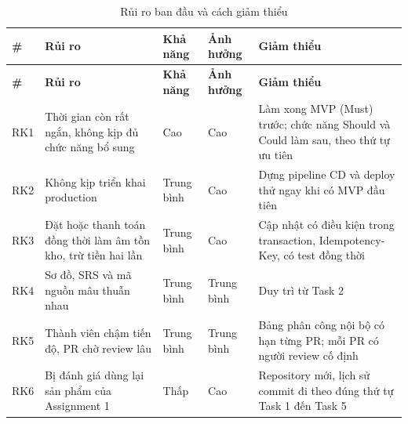 {\small
\begin{longtable}{@{}L{1cm}L{4.2cm}L{1.7cm}L{1.7cm}L{5.3cm}@{}}
\caption{Rủi ro ban đầu và cách giảm thiểu}\label{tab:ruiro}\\
\toprule
\textbf{\#} & \textbf{Rủi ro} & \textbf{Khả năng} & \textbf{Ảnh hưởng} & \textbf{Giảm thiểu} \\ \midrule \endfirsthead
\toprule \textbf{\#} & \textbf{Rủi ro} & \textbf{Khả năng} & \textbf{Ảnh hưởng} & \textbf{Giảm thiểu} \\ \midrule \endhead
\bottomrule \endfoot
RK1 & Thời gian còn rất ngắn, không kịp đủ chức năng bổ sung & Cao & Cao & Làm xong MVP (Must) trước; chức năng Should và Could làm sau, theo thứ tự ưu tiên \\
RK2 & Không kịp triển khai production & Trung bình & Cao & Dựng pipeline CD và deploy thử ngay khi có MVP đầu tiên \\
RK3 & Đặt hoặc thanh toán đồng thời làm âm tồn kho, trừ tiền hai lần & Trung bình & Cao & Cập nhật có điều kiện trong transaction, Idempotency-Key, có test đồng thời \\
RK4 & Sơ đồ, SRS và mã nguồn mâu thuẫn nhau & Trung bình & Trung bình & Duy trì  từ Task 2 \\
RK5 & Thành viên chậm tiến độ, PR chờ review lâu & Trung bình & Trung bình & Bảng phân công nội bộ có hạn từng PR; mỗi PR có người review cố định \\
RK6 & Bị đánh giá dùng lại sản phẩm của Assignment 1 & Thấp & Cao & Repository mới, lịch sử commit đi theo đúng thứ tự Task 1 đến Task 5 \\
\end{longtable}
}